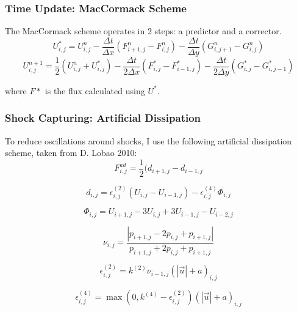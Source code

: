 \documentclass[paper=a4, fontsize=11pt]{scrartcl}
\numberwithin{equation}{section}        %
\numberwithin{figure}{section}          %
\numberwithin{table}{section}               %
\begin{document}
\subsubsection{Time Update: MacCormack Scheme}
The MacCormack scheme operates in 2 steps: a predictor and a corrector.
\begin{equation}
    U^*_{i,j} = U^n_{i,j} - \frac{\Delta t}{\Delta x} (F^n_{i+1,j} - F^n_{i,j}) - \frac{\Delta t}{\Delta y}(G^n_{i,j+1} - G^n_{i,j})
\end{equation}
\begin{equation}
    U^{n+1}_{i,j} = \frac{1}{2}(U^n_{i,j} + U^*_{i,j}) - \frac{\Delta t}{2 \Delta x} (F^*_{i,j} - F^*_{i-1,j}) - \frac{\Delta t}{2 \Delta y}(G^*_{i,j} - G^*_{i,j-1})
\end{equation}

where $F*$ is the flux calculated using $U^*$.
    

\subsubsection{Shock Capturing: Artificial Dissipation}
To reduce oscillations around shocks, I use the following artificial dissipation scheme, taken from D. Lobao 2010:
\begin{equation}
    F^{ad}_{i,j} = \frac{1}{2}(d_{i+1, j} - d_{i-1,j}
\end{equation}

\begin{equation}
    d_{i,j} = \epsilon^{(2)}_{i,j}(U_{i,j} - U_{i-1,j}) - \epsilon^{(4)}_{i,j} \Phi_{i,j}
\end{equation}

\begin{equation}
    \Phi_{i,j} = U_{i+1,j} - 3 U_{i,j} + 3 U_{i-1,j} - U_{i-2,j}
\end{equation}

\begin{equation}
    \nu_{i,j} = \frac{|p_{i+1,j} - 2 p_{i,j} + p_{i+1,j}|}{p_{i+1,j} + 2 p_{i,j} + p_{i+1,j}}
\end{equation}

\begin{equation}
    \epsilon^{(2)}_{i,j} = k^{(2)} \nu_{i-1,j} (|\vec{u}| + a)_{i,j}
\end{equation}

\begin{equation}
    \epsilon^{(4)}_{i,j} = \max(0, k^{(4)} - \epsilon^{(2)}_{i,j}) (|\vec{u}| + a)_{i,j}
\end{equation}
\end{document}
